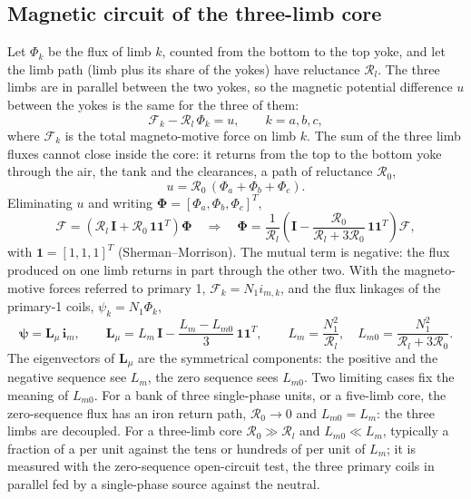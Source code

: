 \documentclass[10pt,a4paper]{scrartcl}
\newcommand{\Rel}{\mathcal{R}}
\newcommand{\vect}[1]{\boldsymbol{#1}}
\newcommand{\one}{\vect{1}}
\begin{document}
\begin{onehalfspace}
\subsection{Magnetic circuit of the three-limb core}

Let $\Phi_k$ be the flux of limb $k$, counted from the bottom to the top yoke, and let the limb path (limb plus its share of the yokes) have reluctance $\Rel_l$. The three limbs are in parallel between the two yokes, so the magnetic potential difference $u$ between the yokes is the same for the three of them:
\begin{equation}
\mathcal{F}_k - \Rel_l\,\Phi_k = u , \qquad k = a,b,c ,
\label{eq:limb}
\end{equation}
where $\mathcal{F}_k$ is the total magneto-motive force on limb $k$. The sum of the three limb fluxes cannot close inside the core: it returns from the top to the bottom yoke through the air, the tank and the clearances, a path of reluctance $\Rel_0$,
\begin{equation}
u = \Rel_0\,(\Phi_a + \Phi_b + \Phi_c) .
\label{eq:zero}
\end{equation}
Eliminating $u$ and writing $\vect{\Phi}=[\Phi_a,\Phi_b,\Phi_c]^T$,
\begin{equation}
\vect{\mathcal{F}} = \left(\Rel_l\,\mathbf{I} + \Rel_0\,\one\one^T\right)\vect{\Phi}
\quad\Longrightarrow\quad
\vect{\Phi} = \frac{1}{\Rel_l}\left(\mathbf{I} - \frac{\Rel_0}{\Rel_l + 3\Rel_0}\,\one\one^T\right)\vect{\mathcal{F}} ,
\label{eq:magcirc}
\end{equation}
with $\one=[1,1,1]^T$ (Sherman--Morrison). The mutual term is negative: the flux produced on one limb returns in part through the other two. With the magneto-motive forces referred to primary 1, $\mathcal{F}_k = N_1 i_{m,k}$, and the flux linkages of the primary-1 coils, $\psi_k = N_1\Phi_k$,
\begin{equation}
\boxed{\;\vect{\psi} = \mathbf{L}_\mu\,\vect{i}_m , \qquad
\mathbf{L}_\mu = L_m\,\mathbf{I} - \frac{L_m - L_{m0}}{3}\,\one\one^T , \qquad
L_m = \frac{N_1^2}{\Rel_l}, \quad L_{m0} = \frac{N_1^2}{\Rel_l + 3\Rel_0} .\;}
\label{eq:Lmu}
\end{equation}
The eigenvectors of $\mathbf{L}_\mu$ are the symmetrical components: the positive and the negative sequence see $L_m$, the zero sequence sees $L_{m0}$. Two limiting cases fix the meaning of $L_{m0}$. For a bank of three single-phase units, or a five-limb core, the zero-sequence flux has an iron return path, $\Rel_0\to0$ and $L_{m0}=L_m$: the three limbs are decoupled. For a three-limb core $\Rel_0\gg\Rel_l$ and $L_{m0}\ll L_m$, typically a fraction of a per unit against the tens or hundreds of per unit of $L_m$; it is measured with the zero-sequence open-circuit test, the three primary coils in parallel fed by a single-phase source against the neutral.


\end{onehalfspace}
\end{document}
